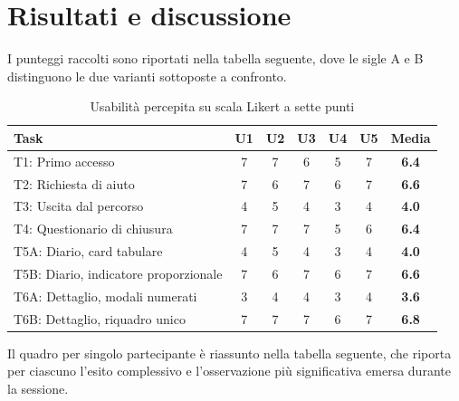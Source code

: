 \section{Risultati e discussione}
\label{sec:risultati}

I punteggi raccolti sono riportati nella tabella seguente, dove le sigle A e B distinguono le due varianti sottoposte a confronto.

\begin{table}[htbp]
    \centering
    \renewcommand{\arraystretch}{1.2}
    \begin{tabular}{lcccccc}
        \toprule
        \textbf{Task} & \textbf{U1} & \textbf{U2} & \textbf{U3} & \textbf{U4} & \textbf{U5} & \textbf{Media} \\
        \midrule
        T1: Primo accesso & 7 & 7 & 6 & 5 & 7 & \textbf{6.4} \\
        T2: Richiesta di aiuto & 7 & 6 & 7 & 6 & 7 & \textbf{6.6} \\
        T3: Uscita dal percorso & 4 & 5 & 4 & 3 & 4 & \textbf{4.0} \\
        T4: Questionario di chiusura & 7 & 7 & 7 & 5 & 6 & \textbf{6.4} \\
        T5A: Diario, card tabulare & 4 & 5 & 4 & 3 & 4 & \textbf{4.0} \\
        T5B: Diario, indicatore proporzionale & 7 & 6 & 7 & 6 & 7 & \textbf{6.6} \\
        T6A: Dettaglio, modali numerati & 3 & 4 & 4 & 3 & 4 & \textbf{3.6} \\
        T6B: Dettaglio, riquadro unico & 7 & 7 & 7 & 6 & 7 & \textbf{6.8} \\
        \bottomrule
    \end{tabular}
    \caption{Usabilità percepita su scala Likert a sette punti}
    \label{tab:punteggi}
\end{table}

Il quadro per singolo partecipante è riassunto nella tabella seguente, che riporta per ciascuno l'esito complessivo e l'osservazione più significativa emersa durante la sessione.

